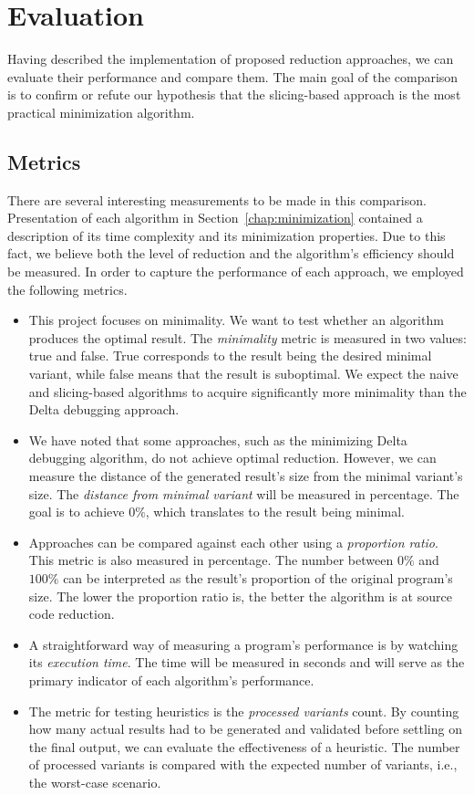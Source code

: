 \chapter{Evaluation}\label{chap:evaluation}

Having described the implementation of proposed reduction approaches, we can 
evaluate their performance and compare them. 
The main goal of the comparison is to confirm or refute our hypothesis that 
the slicing-based approach is the most practical minimization algorithm.

\section{Metrics}\label{chap:metrics}

There are several interesting measurements to be made in this comparison.
Presentation of each algorithm in Section~\ref{chap:minimization} contained 
a description of its time complexity and its minimization properties. 
Due to this fact, we believe both the level of reduction and the algorithm's 
efficiency should be measured. 
In order to capture the performance of each approach, we employed 
the following metrics.
\begin{itemize}
\item This project focuses on minimality. 
  We want to test whether an algorithm produces the optimal result. 
  The \emph{minimality} metric is measured in two values: true and false. 
  True corresponds to the result being the desired minimal variant, while 
  false means that the result is suboptimal.
   We expect the naive and slicing-based algorithms to acquire significantly 
   more minimality than the Delta debugging approach.
  \item We have noted that some approaches, such as the minimizing Delta 
  debugging algorithm, do not achieve optimal reduction. 
  However, we can measure the distance of the generated result's size from 
  the minimal variant's size. 
  The \emph{distance from minimal variant} will be measured in percentage. 
  The goal is to achieve $0\%$, which translates to the result being 
  minimal.
  \item{Approaches} can be compared against each other using 
  a \emph{proportion ratio}. 
  This metric is also measured in percentage. 
  The number between $0\%$ and $100\%$ can be interpreted as the result's 
  proportion of the original program's size. 
  The lower the proportion ratio is, the better the algorithm is at source 
  code reduction.
  \item A straightforward way of measuring a program's performance is by 
  watching its \emph{execution time}. 
  The time will be measured in seconds and will serve as the primary 
  indicator of each algorithm's performance.
  \item The metric for testing heuristics is the \emph{processed variants} 
  count. 
  By counting how many actual results had to be generated and validated 
  before settling on the final output, we can evaluate the effectiveness of 
  a heuristic.
  The number of processed variants is compared with the expected number 
  of variants, i.e., the worst-case scenario.
\end{itemize}
